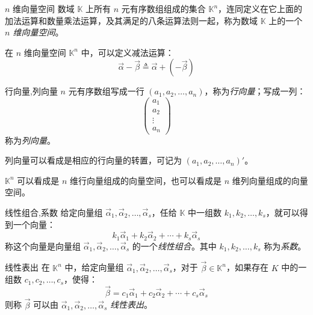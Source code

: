 \begin{definition}{$n$ 维向量空间}
	数域 $\mathbb K$ 上所有 $n$ 元有序数组组成的集合 $\mathbb K^n$，连同定义在它上面的加法运算和数量乘法运算，及其满足的八条运算法则一起，称为数域 $\mathbb K$ 上的一个 \emph{$n$ 维向量空间}。
\end{definition}

在 $n$ 维向量空间 $\mathbb K^n$ 中，可以定义减法运算：
$$
\vec \alpha - \vec \beta \triangleq \vec \alpha + (- \vec \beta)
$$

\begin{definition}{行向量,列向量}
	$n$ 元有序数组写成一行 $(a_1, a_2, \ldots, a_n)$，称为\emph{行向量}；写成一列：
	$$
	\begin{pmatrix}
		a_1 \\ a_2 \\ \vdots \\ a_n
	\end{pmatrix}
	$$
	称为\emph{列向量}。

	列向量可以看成是相应的行向量的转置，可记为 $(a_1, a_2, \ldots, a_n)'$。
\end{definition}

$\mathbb K^n$ 可以看成是 $n$ 维行向量组成的向量空间，也可以看成是 $n$ 维列向量组成的向量空间。

\begin{definition}{线性组合,系数}
	给定向量组 $\vec \alpha_1, \vec \alpha_2, \ldots, \vec \alpha_s$，任给 $\mathbb K$ 中一组数 $k_1, k_2, \ldots, k_s$，就可以得到一个向量：
	$$
	k_1 \vec \alpha_1 + k_2 \vec \alpha_2 + \cdots + k_s \vec \alpha_s
	$$
	称这个向量是向量组 $\vec \alpha_1, \vec \alpha_2, \ldots, \vec \alpha_s$ 的一个\emph{线性组合}。其中 $k_1, k_2, \ldots, k_s$ 称为\emph{系数}。
\end{definition}

\begin{definition}{线性表出}
	在 $\mathbb K^n$ 中，给定向量组 $\vec \alpha_1, \vec \alpha_2, \ldots, \vec \alpha_s$，对于 $\vec \beta \in \mathbb K^n$，如果存在 $K$ 中的一组数 $c_1, c_2, \ldots, c_s$，使得：
	$$
	\vec \beta = c_1 \vec \alpha_1 + c_2 \vec \alpha_2 + \cdots + c_s \vec \alpha_s
	$$
	则称 $\vec \beta$ 可以由 $\vec \alpha_1, \vec \alpha_2, \ldots, \vec \alpha_s$ \emph{线性表出}。
\end{definition}

